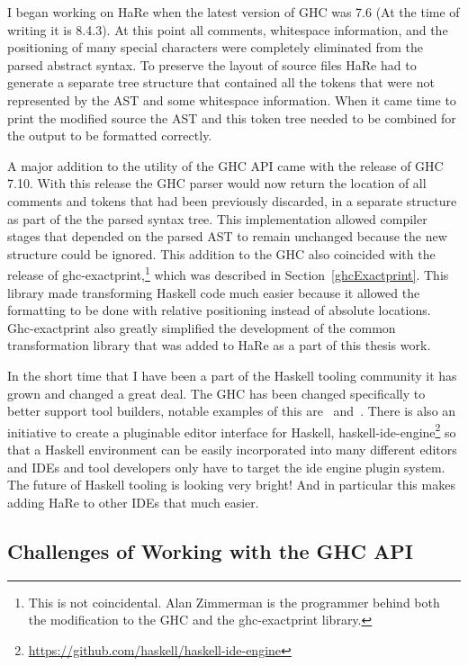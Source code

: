 I began working on HaRe when the latest version of GHC was 7.6 (At the time of writing it is 8.4.3). At this point all comments, whitespace information, and the positioning of many special characters were completely eliminated from the parsed abstract syntax. To preserve the layout of source files HaRe had to generate a separate tree structure that contained all the tokens that were not represented by the AST and some whitespace information. When it came time to print the modified source the AST and this token tree needed to be combined for the output to be formatted correctly. 

A major addition to the utility of the GHC API came with the release of GHC 7.10. With this release the GHC parser would now return the location of all comments and tokens that had been previously discarded, in a separate structure as part of the the parsed syntax tree. This implementation allowed compiler stages that depended on the parsed AST to remain unchanged because the new structure could be ignored. This addition to the GHC also coincided with the release of ghc-exactprint,\footnote{This is not coincidental. Alan Zimmerman is the programmer behind both the modification to the GHC and the ghc-exactprint library.} which was described in Section~\ref{ghcExactprint}. This library made transforming Haskell code much easier because it allowed the formatting to be done with relative positioning instead of absolute locations. Ghc-exactprint also greatly simplified the development of the common transformation library that was added to HaRe as a part of this thesis work. 

In the short time that I have been a part of the Haskell tooling community it has grown and changed a great deal. The GHC has been changed specifically to better support tool builders, notable examples of this are~\cite{apiAnns} and~\cite{treesThatGrow}. There is also an initiative to create a pluginable editor interface for Haskell, haskell-ide-engine\footnote{\url{https://github.com/haskell/haskell-ide-engine}} so that a Haskell environment can be easily incorporated into many different editors and IDEs and tool developers only have to target the ide engine plugin system. The future of Haskell tooling is looking very bright! And in particular this makes adding HaRe to other IDEs that much easier. 

\subsection{Challenges of Working with the GHC API}

